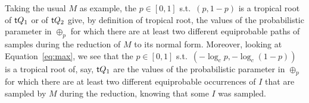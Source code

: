 \begin{remark}
 Taking the usual $M$ as example, the $p\in[0,1]$ s.t.\ $(p,1-p)$ is a tropical root of $\mathsf{t} Q_1$ or of $\mathsf{t} Q_2$ give, by definition of tropical root, the values of the probabilistic parameter in $\oplus_p$ for which there are at least two different equiprobable paths of samples during the reduction of $M$ to its normal form.
 Moreover, looking at Equation~\ref{eq:max}, we see that the $p\in[0,1]$ s.t.\ $(-\log_c p,-\log_c(1-p))$ is a tropical root of, say, $\mathsf{t} Q_1$ are the values of the probabilistic parameter in $\oplus_p$ for which there are at least two different equiprobable occurrences of $I$ that are sampled by $M$ during the reduction, knowing that some $I$ was sampled.
\end{remark}
